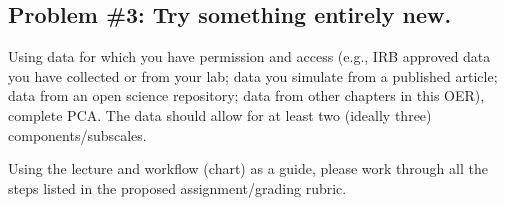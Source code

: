 \documentclass[
  english,
]{book}
\begin{document}
\hypertarget{problem-3-try-something-entirely-new.-3}{%
\subsection{Problem \#3: Try something entirely new.}\label{problem-3-try-something-entirely-new.-3}}

Using data for which you have permission and access (e.g., IRB approved data you have collected or from your lab; data you simulate from a published article; data from an open science repository; data from other chapters in this OER), complete PCA. The data should allow for at least two (ideally three) components/subscales.

Using the lecture and workflow (chart) as a guide, please work through all the steps listed in the proposed assignment/grading rubric.
\end{document}
